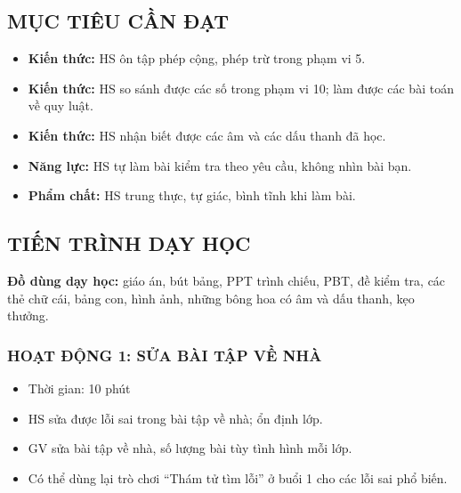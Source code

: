 \documentclass[../main.tex]{subfiles}
\begin{document}
\subsection{MỤC TIÊU CẦN ĐẠT}
\begin{itemize}
    \item \textbf{Kiến thức:} HS ôn tập phép cộng, phép trừ trong phạm vi 5.
    \item \textbf{Kiến thức:} HS so sánh được các số trong phạm vi 10; làm được các bài toán về quy luật.
    \item \textbf{Kiến thức:} HS nhận biết được các âm và các dấu thanh đã học.
    \item \textbf{Năng lực:} HS tự làm bài kiểm tra theo yêu cầu, không nhìn bài bạn.
    \item \textbf{Phẩm chất:} HS trung thực, tự giác, bình tĩnh khi làm bài.
\end{itemize}

\subsection{TIẾN TRÌNH DẠY HỌC}
\textbf{Đồ dùng dạy học:} giáo án, bút bảng, PPT trình chiếu, PBT, đề kiểm tra, các thẻ chữ cái, bảng con, hình ảnh, những bông hoa có âm và dấu thanh, kẹo thưởng.

\subsubsection{HOẠT ĐỘNG 1: SỬA BÀI TẬP VỀ NHÀ}
\begin{hd}
    \begin{itemize}
        \item Thời gian: 10 phút
        \item HS sửa được lỗi sai trong bài tập về nhà; ổn định lớp.
    \end{itemize}
\end{hd}
\begin{itemize}
    \item GV sửa bài tập về nhà, số lượng bài tùy tình hình mỗi lớp.
    \item Có thể dùng lại trò chơi “Thám tử tìm lỗi” ở buổi 1 cho các lỗi sai phổ biến.
\end{itemize}

\end{document}
